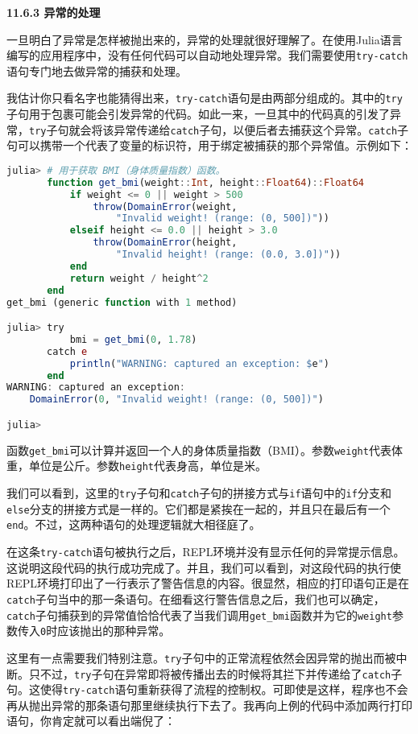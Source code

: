 \textbf{11.6.3 异常的处理}

一旦明白了异常是怎样被抛出来的，异常的处理就很好理解了。在使用Julia语言编写的应用程序中，没有任何代码可以自动地处理异常。我们需要使用\verb`try-catch`语句专门地去做异常的捕获和处理。

我估计你只看名字也能猜得出来，\verb`try-catch`语句是由两部分组成的。其中的\verb`try`子句用于包裹可能会引发异常的代码。如此一来，一旦其中的代码真的引发了异常，\verb`try`子句就会将该异常传递给\verb`catch`子句，以便后者去捕获这个异常。\verb`catch`子句可以携带一个代表了变量的标识符，用于绑定被捕获的那个异常值。示例如下：

\begin{lstlisting}[language=julia]
julia> # 用于获取 BMI（身体质量指数）函数。
       function get_bmi(weight::Int, height::Float64)::Float64
           if weight <= 0 || weight > 500
               throw(DomainError(weight, 
                   "Invalid weight! (range: (0, 500])"))
           elseif height <= 0.0 || height > 3.0
               throw(DomainError(height, 
                   "Invalid height! (range: (0.0, 3.0])"))
           end
           return weight / height^2
       end
get_bmi (generic function with 1 method)

julia> try 
           bmi = get_bmi(0, 1.78)
       catch e
           println("WARNING: captured an exception: $e")
       end
WARNING: captured an exception: 
    DomainError(0, "Invalid weight! (range: (0, 500])")

julia> 
\end{lstlisting}

函数\verb`get_bmi`可以计算并返回一个人的身体质量指数（BMI）。参数\verb`weight`代表体重，单位是公斤。参数\verb`height`代表身高，单位是米。

我们可以看到，这里的\verb`try`子句和\verb`catch`子句的拼接方式与\verb`if`语句中的\verb`if`分支和\verb`else`分支的拼接方式是一样的。它们都是紧挨在一起的，并且只在最后有一个\verb`end`。不过，这两种语句的处理逻辑就大相径庭了。

在这条\verb`try-catch`语句被执行之后，REPL环境并没有显示任何的异常提示信息。这说明这段代码的执行成功完成了。并且，我们可以看到，对这段代码的执行使REPL环境打印出了一行表示了警告信息的内容。很显然，相应的打印语句正是在\verb`catch`子句当中的那一条语句。在细看这行警告信息之后，我们也可以确定，\verb`catch`子句捕获到的异常值恰恰代表了当我们调用\verb`get_bmi`函数并为它的\verb`weight`参数传入\verb`0`时应该抛出的那种异常。

这里有一点需要我们特别注意。\verb`try`子句中的正常流程依然会因异常的抛出而被中断。只不过，\verb`try`子句在异常即将被传播出去的时候将其拦下并传递给了\verb`catch`子句。这使得\verb`try-catch`语句重新获得了流程的控制权。可即使是这样，程序也不会再从抛出异常的那条语句那里继续执行下去了。我再向上例的代码中添加两行打印语句，你肯定就可以看出端倪了：

